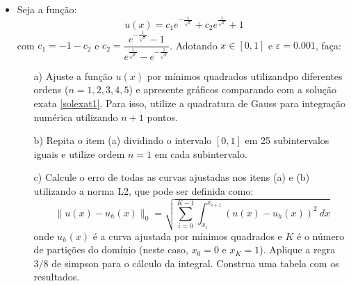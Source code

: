 \documentclass{article}
\newcounter{execs}
\newcommand{\exec}[0]{\addtocounter{execs}{1}\item[\textbf{\arabic{execs}.}]}
\begin{document}
\thispagestyle{first}
%    

\begin{itemize}

\exec Seja a função:
\begin{equation}\label{solexat1}
u(x) = c_1 e^{-\tfrac{x}{\sqrt{\varepsilon}}} + c_2 e^{\tfrac{x}{\sqrt{\varepsilon}}}+1
\end{equation}
com $c_1 = -1-c_2$ e $c_2 = \dfrac{e^{-\tfrac{1}{\sqrt{\varepsilon}}}-1}
{e^{\tfrac{1}{\sqrt{\varepsilon}}}-e^{-\tfrac{1}{\sqrt{\varepsilon}}}}$.
Adotando $x\in [0,1]$ e $\varepsilon=0.001$, faça:

\begin{itemize}

\item[a)] Ajuste a função $u(x)$ por mínimos quadrados utilizandpo diferentes ordens ($n=1,2,3,4,5$) e apresente gráficos comparando com a solução exata \eqref{solexat1}. Para isso, utilize a quadratura de Gauss para integração numérica utilizando $n+1$ pontos. 

\item [b)] Repita o item (a) dividindo o intervalo $[0,1]$ em 25 subintervalos iguais e utilize ordem $n=1$ em cada subintervalo. 

\item [c)] Calcule o erro de todas as curvas ajustadas nos itens (a) e (b) utilizando a norma L2, que pode ser definida como:
$$
\|u(x)-u_h(x)\|_0 =\sqrt{ \sum_{i=0}^{K-1} \int_{x_i}^{x_{i+1}} (u(x)-u_h(x))^2~dx}
$$
onde $u_h(x)$ é a curva ajustada por mínimos quadrados e $K$ é o número de partições do domínio (neste caso, $x_0=0$ e $x_K=1$). Aplique a regra $3/8$ de simpson para o cálculo da integral. Construa uma tabela com os resultados.

\end{itemize}





\end{itemize}
\end{document}
